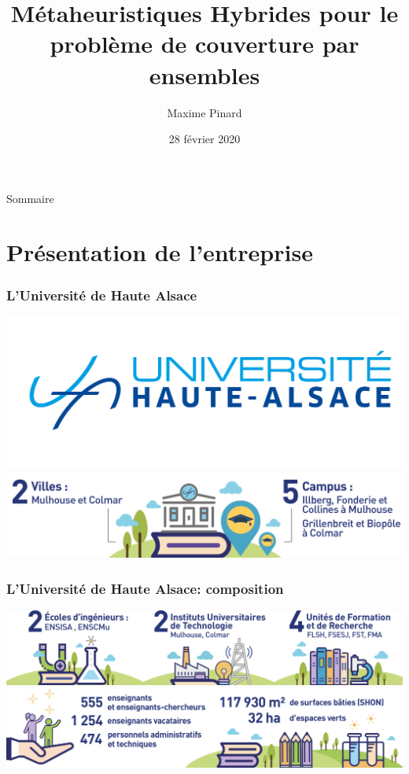 \documentclass[11pt]{beamer}
\title{Métaheuristiques Hybrides pour le problème de couverture par ensembles}
\author{Maxime Pinard}
\institute[UTBM]{Université de Technologie de Belfort Montbéliard}
\date[27/02/2020]{28 février 2020}
\begin{document}
	\begin{frame}
		\titlepage
	\end{frame}
	\begin{frame}{Sommaire}
		\tableofcontents
	\end{frame}
	\section{Présentation de l'entreprise}
		\begin{frame}[t]
			\frametitle{L'Université de Haute Alsace}
			\centering
			\includegraphics[width=0.8\linewidth]{UHA_logo}
			\vspace{30pt}
			\includegraphics[width=0.9\linewidth]{UHA_villes_campus}
		\end{frame}
		\begin{frame}[t]
			\frametitle{L'Université de Haute Alsace: composition}
			\centering
			\vspace{25pt}
			\includegraphics[width=\linewidth]{UHA_composition}
			\\\vspace{30pt}
			\includegraphics[width=\linewidth]{UHA_personnel_surface}
		\end{frame}
\end{document}
